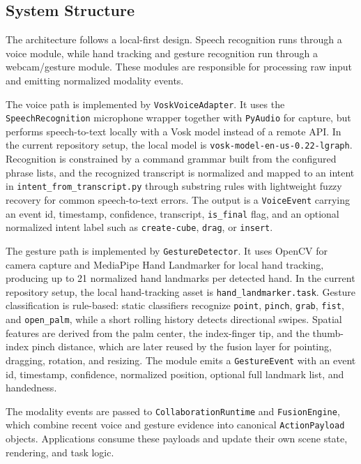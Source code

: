 \documentclass[sigconf]{acmart}
\begin{document}
\subsection{System Structure}
The architecture follows a local-first design. Speech recognition runs through
a voice module, while hand tracking and gesture recognition run through a
webcam/gesture module. These modules are responsible for processing raw input
and emitting normalized modality events.

The voice path is implemented by \texttt{VoskVoiceAdapter}. It uses the
\texttt{SpeechRecognition} microphone wrapper together with \texttt{PyAudio}
for capture, but performs speech-to-text locally with a Vosk model instead of a
remote API. In the current repository setup, the local model is
\texttt{vosk-model-en-us-0.22-lgraph}. Recognition is constrained by a command grammar built
from the configured phrase lists, and the recognized transcript is normalized
and mapped to an intent in \texttt{intent\_from\_transcript.py} through
substring rules with lightweight fuzzy recovery for common speech-to-text errors. The
output is a
\texttt{VoiceEvent} carrying an event id, timestamp, confidence, transcript,
\texttt{is\_final} flag, and an optional normalized intent label such as
\texttt{create-cube}, \texttt{drag}, or \texttt{insert}.

The gesture path is implemented by \texttt{GestureDetector}. It uses OpenCV for
camera capture and MediaPipe Hand Landmarker for local hand tracking, producing
up to 21 normalized hand landmarks per detected hand. In the current
repository setup, the local hand-tracking asset is
\texttt{hand\_landmarker.task}.
Gesture classification is rule-based: static classifiers recognize
\texttt{point}, \texttt{pinch}, \texttt{grab}, \texttt{fist}, and
\texttt{open\_palm}, while a short rolling history detects directional swipes.
Spatial features are derived from the palm center, the index-finger tip, and
the thumb-index pinch distance, which are later reused by the fusion layer for
pointing, dragging, rotation, and resizing. The module emits a
\texttt{GestureEvent} with an event id, timestamp, confidence, normalized
position, optional full landmark list, and handedness.

The modality events are passed to \texttt{CollaborationRuntime} and
\texttt{FusionEngine}, which combine recent voice and gesture evidence into canonical
\texttt{ActionPayload} objects. Applications consume these payloads and update
their own scene state, rendering, and task logic.
\end{document}
